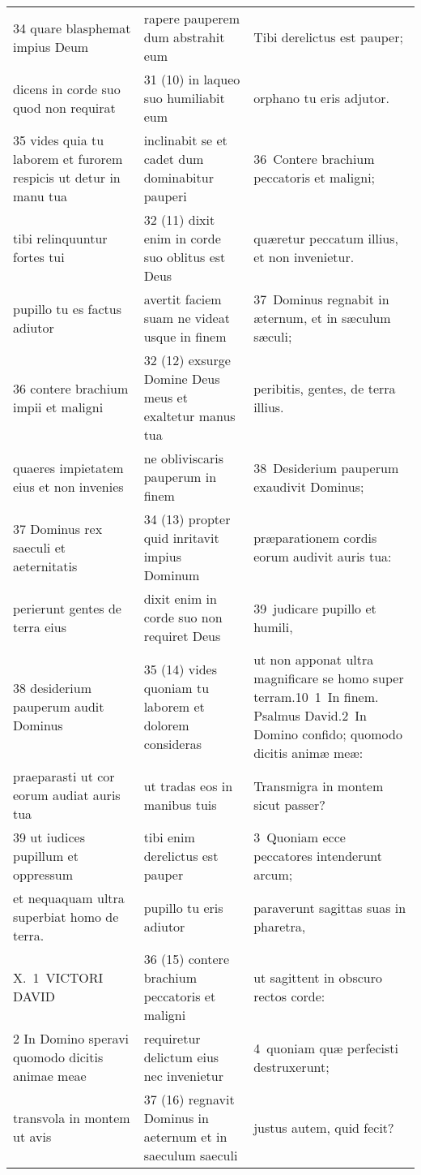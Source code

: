 \documentclass{article}
\begin{document}
\begin{longtable}{@{}p{}p{}p{}@{}}
34 quare blasphemat impius Deum	&	rapere pauperem dum abstrahit eum	&	Tibi derelictus est pauper;	\\
dicens in corde suo quod non requirat	&	31 (10) in laqueo suo humiliabit eum	&	orphano tu eris adjutor.	\\
35 vides quia tu laborem et furorem respicis ut detur in manu tua	&	inclinabit se et cadet dum dominabitur pauperi	&	36 Contere brachium peccatoris et maligni;	\\
tibi relinquuntur fortes tui	&	32 (11) dixit enim in corde suo oblitus est Deus	&	quæretur peccatum illius, et non invenietur.	\\
pupillo tu es factus adiutor	&	avertit faciem suam ne videat usque in finem	&	37 Dominus regnabit in æternum, et in sæculum sæculi;	\\
36 contere brachium impii et maligni	&	32 (12) exsurge Domine Deus meus et exaltetur manus tua	&	peribitis, gentes, de terra illius.	\\
quaeres impietatem eius et non invenies	&	ne obliviscaris pauperum in finem	&	38 Desiderium pauperum exaudivit Dominus;	\\
37 Dominus rex saeculi et aeternitatis	&	34 (13) propter quid inritavit impius Dominum	&	præparationem cordis eorum audivit auris tua:	\\
perierunt gentes de terra eius	&	dixit enim in corde suo non requiret Deus	&	39 judicare pupillo et humili,	\\
38 desiderium pauperum audit Dominus	&	35 (14) vides quoniam tu laborem et dolorem consideras	&	ut non apponat ultra magnificare se homo super terram.10 1 In finem. Psalmus David.2 In Domino confido; quomodo dicitis animæ meæ:	\\
praeparasti ut cor eorum audiat auris tua	&	ut tradas eos in manibus tuis	&	Transmigra in montem sicut passer?	\\
39 ut iudices pupillum et oppressum	&	tibi enim derelictus est pauper	&	3 Quoniam ecce peccatores intenderunt arcum;	\\
et nequaquam ultra superbiat homo de terra.	&	pupillo tu eris adiutor	&	paraverunt sagittas suas in pharetra,	\\
X. 1 VICTORI DAVID	&	36 (15) contere brachium peccatoris et maligni	&	ut sagittent in obscuro rectos corde:	\\
2 In Domino speravi quomodo dicitis animae meae	&	requiretur delictum eius nec invenietur	&	4 quoniam quæ perfecisti destruxerunt;	\\
transvola in montem ut avis	&	37 (16) regnavit Dominus in aeternum et in saeculum saeculi	&	justus autem, quid fecit?	\\

\end{longtable}
\end{document}
